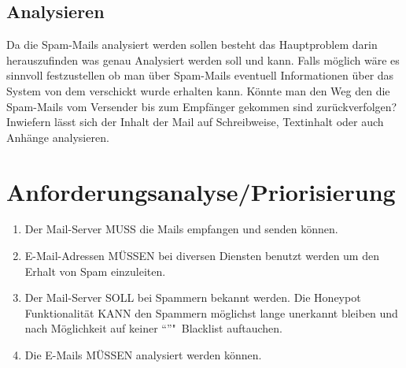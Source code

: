 \documentclass[a4paper,11pt,singlespacing]{article}
\begin{document}
	\subsection{Analysieren}\label{sec:ProblemstellungAnalysieren}
		Da die Spam-Mails analysiert werden sollen besteht das Hauptproblem darin herauszufinden was genau Analysiert werden soll und kann.
		Falls möglich wäre es sinnvoll festzustellen ob man über Spam-Mails eventuell Informationen über das System von dem verschickt wurde erhalten kann.
		Könnte man den Weg den die Spam-Mails vom Versender bis zum Empfänger gekommen sind zurückverfolgen?
		Inwiefern lässt sich der Inhalt der Mail auf Schreibweise, Textinhalt oder auch Anhänge analysieren.


\section{Anforderungsanalyse/Priorisierung}\label{sec:AnforderungsanalysePriorisierung}
	\begin{enumerate}
	\item Der Mail-Server MUSS die Mails empfangen und senden können. %
	\item E-Mail-Adressen MÜSSEN bei diversen Diensten benutzt werden um den Erhalt von Spam einzuleiten. %
	\item Der Mail-Server SOLL bei Spammern bekannt werden. Die Honeypot Funktionalität KANN den Spammern möglichst lange unerkannt bleiben und nach Möglichkeit auf keiner "`"'"~Blacklist auftauchen. %
	\item Die E-Mails MÜSSEN analysiert werden können.
	\end{enumerate}
\end{document}
